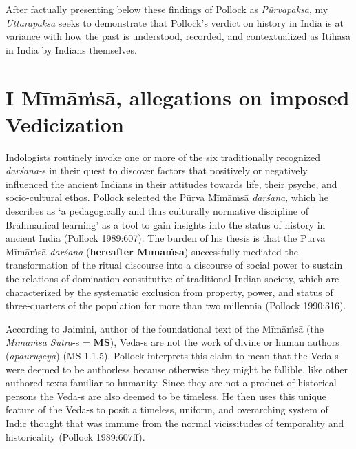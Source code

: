 After factually presenting below these findings of Pollock as \textit{Pūrvapakṣa}, my \textit{Uttarapakṣa} seeks to demonstrate that Pollock’s verdict on history in India is at variance with how the past is understood, recorded, and contextualized as Itihāsa in India by Indians themselves.


\section*{I Mīmāṁsā, allegations on imposed Vedicization}

Indologists routinely invoke one or more of the six traditionally recognized \textit{darśana-}s in their quest to discover factors that positively or negatively influenced the ancient Indians in their attitudes towards life, their psyche, and socio-cultural ethos. Pollock selected the Pūrva Mīmāṁsā \textit{darśana}, which he describes as ‘a pedagogically and thus culturally normative discipline of Brahmanical learning’ as a tool to gain insights into the status of history in ancient India (Pollock 1989:607). The burden of his thesis is that the Pūrva Mīmāṁsā \textit{darśana} (\textbf{hereafter Mīmāṁsā}) successfully mediated the transformation of the ritual discourse into a discourse of social power to sustain the relations of domination constitutive of traditional Indian society, which are characterized by the systematic exclusion from property, power, and status of three-quarters of the population for more than two millennia (Pollock 1990:316).

According to Jaimini, author of the foundational text of the Mīmāṁsā (the \textit{Mīmāṁsā Sūtra}-s = \textbf{MS}), Veda-s are not the work of divine or human authors (\textit{apauruṣeya}) (MS 1.1.5). Pollock interprets this claim to mean that the Veda-s were deemed to be authorless because otherwise they might be fallible, like other authored texts familiar to humanity. Since they are not a product of historical persons the Veda-s are also deemed to be timeless. He then uses this unique feature of the Veda-s to posit a timeless, uniform, and overarching system of Indic thought that was immune from the normal vicissitudes of temporality and historicality (Pollock 1989:607ff).

